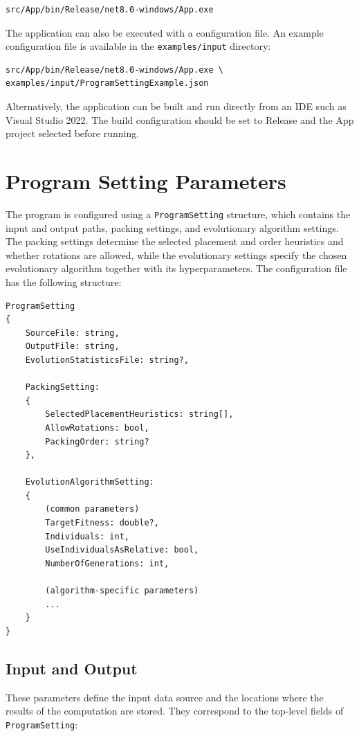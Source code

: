 \begin{verbatim}
src/App/bin/Release/net8.0-windows/App.exe
\end{verbatim}

The application can also be executed with a configuration file.
An example configuration file is available in the \texttt{examples/input} directory:

\begin{verbatim}
src/App/bin/Release/net8.0-windows/App.exe \
examples/input/ProgramSettingExample.json
\end{verbatim}

Alternatively, the application can be built and run directly from an IDE such as Visual Studio 2022. The build configuration should be set to Release and the App project selected before running.

\section{Program Setting Parameters}

The program is configured using a \texttt{ProgramSetting} structure, 
which contains the input and output paths, packing settings, 
and evolutionary algorithm settings. 
The packing settings determine the selected placement and order heuristics 
and whether rotations are allowed, while the evolutionary settings specify 
the chosen evolutionary algorithm together with its hyperparameters. 
The configuration file has the following structure:

\begin{verbatim}
ProgramSetting
{
    SourceFile: string,
    OutputFile: string,
    EvolutionStatisticsFile: string?,

    PackingSetting:
    {
        SelectedPlacementHeuristics: string[],
        AllowRotations: bool,
        PackingOrder: string?
    },

    EvolutionAlgorithmSetting:
    {
        (common parameters)
        TargetFitness: double?,
        Individuals: int,
        UseIndividualsAsRelative: bool,
        NumberOfGenerations: int,

        (algorithm-specific parameters)
        ...
    }
}
\end{verbatim}

\subsection{Input and Output}

These parameters define the input data source and the locations where the results of the computation are stored. They correspond to the top-level fields of \texttt{ProgramSetting}:

